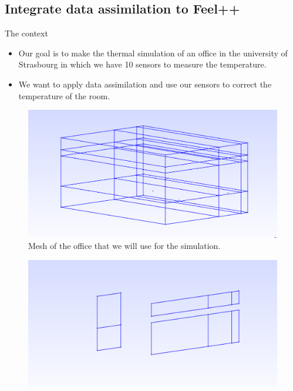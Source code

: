\subsection{Integrate data assimilation to Feel++}
\begin{frame}[allowframebreaks]{The context}
\begin{itemize}
    \item Our goal is to make the thermal simulation of an office in the university of Strasbourg in which we have 10 sensors to measure the temperature.\\
    \item We want to apply data assimilation and use our sensors to correct the temperature of the room.
\end{itemize}

\begin{minipage}{0.48\linewidth}
    \begin{figure}
        \centering
        \includegraphics[width=\linewidth]{"images/enkf/Maillage_1.jpg"}
        \caption{Mesh of the office that we will use for the simulation.}
    \end{figure}
\end{minipage} \;
\begin{minipage}{0.48\linewidth}
    \begin{figure}
        \centering
        \includegraphics[width=\linewidth]{"images/enkf/Maillage_2.jpg"}

\end{figure}
\end{minipage}
\end{frame}
